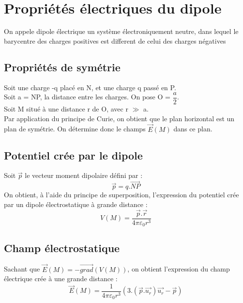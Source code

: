 
\chapter{Propriétés électriques du dipole}
\begin{de}
On appele dipole électrique un système électroniquement neutre, dans lequel le barycentre des charges positives est different de celui des charges négatives
\end{de}
\section{Propriétés de symétrie}
Soit une charge -q placé en N, et une charge q passé en P.\\
Soit a = NP, la distance entre les charges. On pose O = $\dfrac{a}{2}$.\\
Soit M situé à une distance r de O, avec r $\gg$ a.\\
Par application du principe de Curie, on obtient que le plan horizontal est un plan de symétrie. On détermine donc le champs $\overrightarrow{E}(M)$ dans ce plan.
\section{Potentiel crée par le dipole}
Soit $\overrightarrow{p}$ le vecteur moment dipolaire défini par :
$$\overrightarrow{p} = q.\overrightarrow{NP}$$
On obtient, à l'aide du principe de superposition, l'expression du potentiel crée par un dipole électrostatique à grande distance : 
$$V(M) = \dfrac{\overrightarrow{p}.\overrightarrow{r}}{4\pi \varepsilon_0 r^3}$$
\section{Champ électrostatique}
Sachant que $\overrightarrow{E}(M) = -\overrightarrow{grad}(V(M))$, on obtient l'expression du champ électrique crée à une grande distance : 
$$\overrightarrow{E}(M) = \dfrac{1}{4\pi \varepsilon_0 r^3}(3.(\overrightarrow{p}.\overrightarrow{u_r})\overrightarrow{u_r}-\overrightarrow{p})$$
